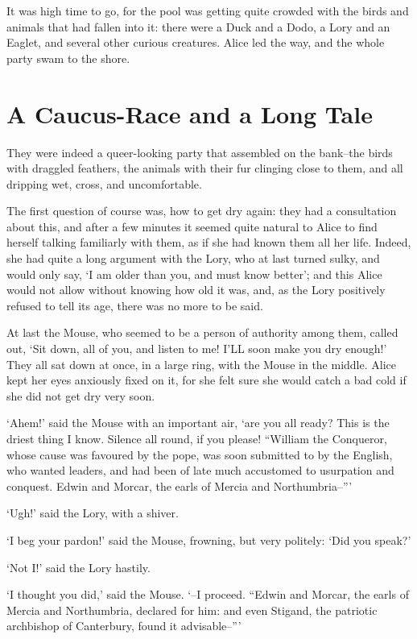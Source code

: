 \documentclass[12pt]{book}
\begin{document}
  It was high time to go, for the pool was getting quite crowded
with the birds and animals that had fallen into it:  there were a
Duck and a Dodo, a Lory and an Eaglet, and several other curious
creatures.  Alice led the way, and the whole party swam to the
shore.

\chapter{A Caucus-Race and a Long Tale}

  They were indeed a queer-looking party that assembled on the
bank--the birds with draggled feathers, the animals with their
fur clinging close to them, and all dripping wet, cross, and
uncomfortable.

  The first question of course was, how to get dry again:  they
had a consultation about this, and after a few minutes it seemed
quite natural to Alice to find herself talking familiarly with
them, as if she had known them all her life.  Indeed, she had
quite a long argument with the Lory, who at last turned sulky,
and would only say, `I am older than you, and must know better';
and this Alice would not allow without knowing how old it was,
and, as the Lory positively refused to tell its age, there was no
more to be said.

  At last the Mouse, who seemed to be a person of authority among
them, called out, `Sit down, all of you, and listen to me!  I'LL
soon make you dry enough!'  They all sat down at once, in a large
ring, with the Mouse in the middle.  Alice kept her eyes
anxiously fixed on it, for she felt sure she would catch a bad
cold if she did not get dry very soon.

  `Ahem!' said the Mouse with an important air, `are you all ready?
This is the driest thing I know.  Silence all round, if you please!
``William the Conqueror, whose cause was favoured by the pope, was
soon submitted to by the English, who wanted leaders, and had been
of late much accustomed to usurpation and conquest.  Edwin and
Morcar, the earls of Mercia and Northumbria--'''

  `Ugh!' said the Lory, with a shiver.

  `I beg your pardon!' said the Mouse, frowning, but very
politely:  `Did you speak?'

  `Not I!' said the Lory hastily.

  `I thought you did,' said the Mouse.  `--I proceed.  ``Edwin and
Morcar, the earls of Mercia and Northumbria, declared for him:
and even Stigand, the patriotic archbishop of Canterbury, found
it advisable--'''
\end{document}
